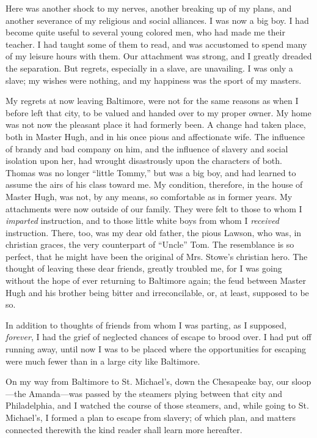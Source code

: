 Here was another shock to my nerves, another breaking up of my plans,
and another severance of my religious and social alliances. I was now a
big boy. I had become quite useful to several young colored men, who had
made me their teacher. I had taught some of them to read, and was
accustomed to spend many of my leisure hours with them. Our
{\protect\hypertarget{183}{}{}}attachment was strong, and I greatly
dreaded the separation. But regrets, especially in a slave, are
unavailing. I was only a slave; my wishes were nothing, and my happiness
was the sport of my masters.

My regrets at now leaving Baltimore, were not for the same reasons as
when I before left that city, to be valued and handed over to my proper
owner. My home was not now the pleasant place it had formerly been. A
change had taken place, both in Master Hugh, and in his once pious and
affectionate wife. The influence of brandy and bad company on him, and
the influence of slavery and social isolation upon her, had wrought
disastrously upon the characters of both. Thomas was no longer ``little
Tommy,'' but was a big boy, and had learned to assume the airs of his
class toward me. My condition, therefore, in the house of Master Hugh,
was not, by any means, so comfortable as in former years. My attachments
were now outside of our family. They were felt to those to whom I
\emph{imparted} instruction, and to those little white boys from whom I
\emph{received} instruction. There, too, was my dear old father, the
pious Lawson, who was, in christian graces, the very counterpart of
``Uncle'' Tom. The resemblance is so perfect, that he might have been
the original of Mrs. Stowe's christian hero. The thought of leaving
these dear friends, greatly troubled me, for I was going without the
hope of ever returning to Baltimore again; the feud between Master Hugh
and his brother being bitter and irreconcilable, or, at least, supposed
to be so.

In addition to thoughts of friends from whom I was parting, as I
supposed, \emph{forever}, I had the grief of
{\protect\hypertarget{184}{}{}}neglected chances of escape to brood
over. I had put off running away, until now I was to be placed where the
opportunities for escaping were much fewer than in a large city like
Baltimore.

On my way from Baltimore to St. Michael's, down the Chesapeake bay, our
sloop---the Amanda---was passed by the steamers plying between that city
and Philadelphia, and I watched the course of those steamers, and, while
going to St. Michael's, I formed a plan to escape from slavery; of which
plan, and matters connected therewith the kind reader shall learn more
hereafter.

~

